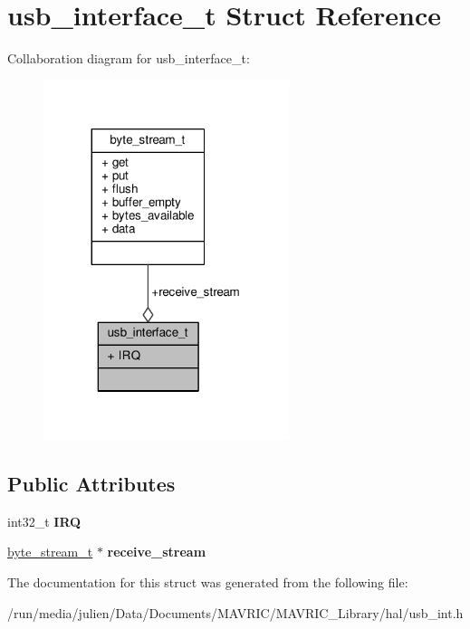 \hypertarget{structusb__interface__t}{\section{usb\+\_\+interface\+\_\+t Struct Reference}
\label{structusb__interface__t}
}


Collaboration diagram for usb\+\_\+interface\+\_\+t\+:
\nopagebreak
\begin{figure}[H]
\begin{center}
\leavevmode
\includegraphics[width=203pt]{structusb__interface__t__coll__graph}
\end{center}
\end{figure}
\subsection*{Public Attributes}
\begin{DoxyCompactItemize}
\item 
\hypertarget{structusb__interface__t_ab6259564dd2ef7e5c0650879aeec6c56}{int32\+\_\+t {\bfseries I\+R\+Q}}\label{structusb__interface__t_ab6259564dd2ef7e5c0650879aeec6c56}

\item 
\hypertarget{structusb__interface__t_a4ad9806f139e0fe81017bd5169854e8f}{\hyperlink{structbyte__stream__t}{byte\+\_\+stream\+\_\+t} $\ast$ {\bfseries receive\+\_\+stream}}\label{structusb__interface__t_a4ad9806f139e0fe81017bd5169854e8f}

\end{DoxyCompactItemize}


The documentation for this struct was generated from the following file\+:\begin{DoxyCompactItemize}
\item 
/run/media/julien/\+Data/\+Documents/\+M\+A\+V\+R\+I\+C/\+M\+A\+V\+R\+I\+C\+\_\+\+Library/hal/usb\+\_\+int.\+h\end{DoxyCompactItemize}
